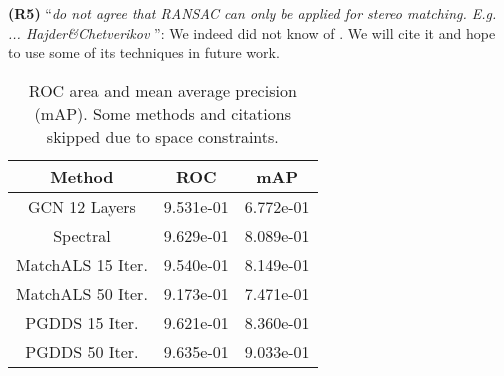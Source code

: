 \documentclass[10pt,twocolumn,letterpaper]{article}
\begin{document}
\textbf{(R5)} ``\textit{do not agree that RANSAC can only be applied for stereo matching. E.g. ... Hajder\&Chetverikov }'':
We indeed did not know of \cite{hajder2006weak}. We will cite it and hope to use some of its techniques in future work.

\begin{table}[t]
\begin{center}
\begin{tabular}{ |c|c|c| }
\hline
Method            & ROC       & mAP       \\ \hline
GCN 12 Layers     & 9.531e-01 & 6.772e-01 \\ \hline
Spectral          & 9.629e-01 & 8.089e-01 \\ \hline
MatchALS  15 Iter.& 9.540e-01 & 8.149e-01 \\ \hline
MatchALS  50 Iter.& 9.173e-01 & 7.471e-01 \\ \hline
PGDDS     15 Iter.& 9.621e-01 & 8.360e-01 \\ \hline
PGDDS     50 Iter.& 9.635e-01 & 9.033e-01 \\ \hline
\end{tabular}
\end{center}
\caption{ROC area and mean average precision (mAP). Some methods and citations skipped due to space constraints.}
\vspace{-15pt}
\end{table}



{\footnotesize


}
\end{document}
